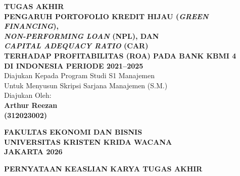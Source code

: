 \documentclass[12pt,a4paper]{article}
\newcommand{\nahamahasiswa}{Arthur Reezan}
\newcommand{\nim}{312023002}
\numberwithin{equation}{section}
\begin{document}
\pagestyle{frontmatter}

\thispagestyle{empty}
\begin{titlepage}
  \begin{center}
    \vspace*{0.5cm}
    {\large\bfseries TUGAS AKHIR}\\[1.2cm]

    {\large\bfseries
      PENGARUH PORTOFOLIO KREDIT HIJAU (\emph{GREEN FINANCING}),\\
      \emph{NON-PERFORMING LOAN} (NPL), DAN\\
      \emph{CAPITAL ADEQUACY RATIO} (CAR)\\
      TERHADAP PROFITABILITAS (ROA) PADA BANK KBMI 4\\
      DI INDONESIA PERIODE 2021--2025
    }\\[1.2cm]

    {\normalsize Diajukan Kepada Program Studi S1 Manajemen}\\[0.2cm]
    {\normalsize Untuk Menyusun Skripsi Sarjana Manajemen (S.M.)}\\[1.2cm]

    {\normalsize Diajukan Oleh:}\\[0.4cm]
    {\large\bfseries \nahamahasiswa}\\[0.2cm]
    {\large\bfseries (\nim)}\\[1.8cm]

    \vfill

    {\large\bfseries FAKULTAS EKONOMI DAN BISNIS}\\[0.3cm]
    {\large\bfseries UNIVERSITAS KRISTEN KRIDA WACANA}\\[0.3cm]
    {\large\bfseries JAKARTA 2026}
  \end{center}
\end{titlepage}

\addtocounter{page}{1}

\newpage
\thispagestyle{frontmatter}
\begin{center}
  {\large\bfseries PERNYATAAN KEASLIAN KARYA TUGAS AKHIR}
\end{center}
\end{document}
